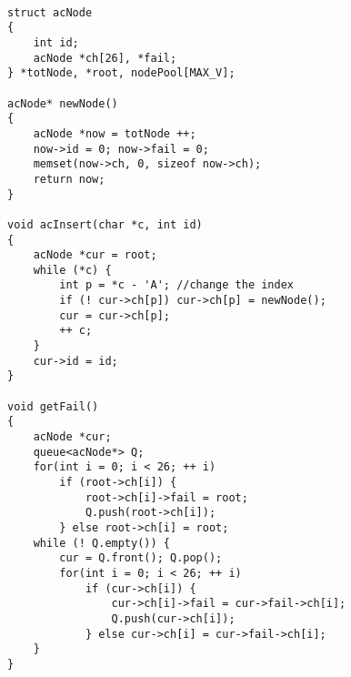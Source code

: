 \begin{lstlisting}

struct acNode
{
    int id;
    acNode *ch[26], *fail;
} *totNode, *root, nodePool[MAX_V];

acNode* newNode()
{
    acNode *now = totNode ++;
    now->id = 0; now->fail = 0;
    memset(now->ch, 0, sizeof now->ch);
    return now;
}

void acInsert(char *c, int id)
{
    acNode *cur = root;
    while (*c) {
        int p = *c - 'A'; //change the index
        if (! cur->ch[p]) cur->ch[p] = newNode();
        cur = cur->ch[p];
        ++ c;
    }
    cur->id = id;
}

void getFail()
{
    acNode *cur;
    queue<acNode*> Q;
    for(int i = 0; i < 26; ++ i)
        if (root->ch[i]) {
            root->ch[i]->fail = root;
            Q.push(root->ch[i]);
        } else root->ch[i] = root;
    while (! Q.empty()) {
        cur = Q.front(); Q.pop();
        for(int i = 0; i < 26; ++ i)
            if (cur->ch[i]) {
                cur->ch[i]->fail = cur->fail->ch[i];
                Q.push(cur->ch[i]);
            } else cur->ch[i] = cur->fail->ch[i];
    }
}
\end{lstlisting}
